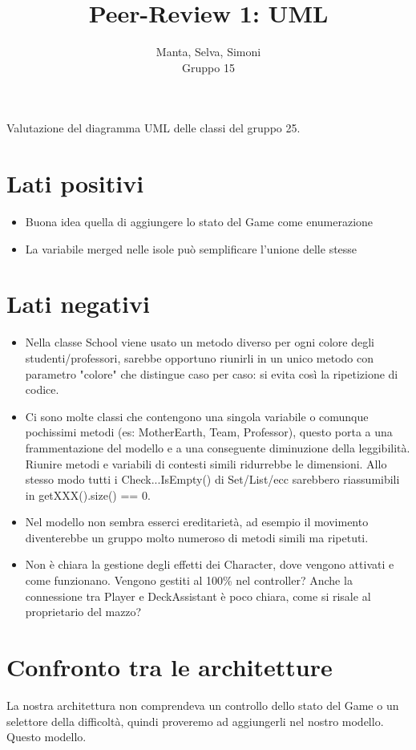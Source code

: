\documentclass[12pt]{article}
\title{Peer-Review 1: UML}
\author{Manta, Selva, Simoni\\Gruppo 15}
\begin{document}
\maketitle

Valutazione del diagramma UML delle classi del gruppo 25.

\section{Lati positivi}

\begin{itemize}
  \item Buona idea quella di aggiungere lo stato del Game come enumerazione
  \item La variabile merged nelle isole può semplificare l'unione delle stesse
\end{itemize}

\section{Lati negativi}

\begin{itemize}
  \item Nella classe School viene usato un metodo diverso per ogni colore degli studenti/professori, sarebbe opportuno riunirli in un unico metodo con parametro "colore" che distingue caso per caso: si evita così la ripetizione di codice.
  \item Ci sono molte classi che contengono una singola variabile o comunque pochissimi metodi (es: MotherEarth, Team, Professor), questo porta a una frammentazione del modello e a una conseguente diminuzione della leggibilità. Riunire metodi e variabili di contesti simili ridurrebbe le dimensioni. Allo stesso modo tutti i Check...IsEmpty() di Set/List/ecc sarebbero riassumibili in getXXX().size() == 0.
  \item Nel modello non sembra esserci ereditarietà, ad esempio il movimento diventerebbe un gruppo molto numeroso di metodi simili ma ripetuti.
  \item Non è chiara la gestione degli effetti dei Character, dove vengono attivati e come funzionano. Vengono gestiti al 100\% nel controller? Anche la connessione tra Player e DeckAssistant è poco chiara, come si risale al proprietario del mazzo?
\end{itemize}

\section{Confronto tra le architetture}

La nostra architettura non comprendeva un controllo dello stato del Game o un selettore della difficoltà, quindi proveremo ad aggiungerli nel nostro modello.
Questo modello.
\end{document}

